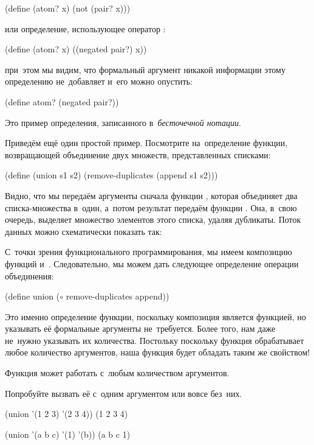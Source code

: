 \begin{SchemeCode}[emph=x]
(define (atom? x) 
  (not (pair? x)))
\end{SchemeCode}
\noindent или определение, использующее оператор :
\begin{SchemeCode}[emph=x]
(define (atom? x) 
  ((negated pair?) x))
\end{SchemeCode}
\noindent при~этом мы видим, что формальный аргумент  никакой информации этому определению не~добавляет и~его можно опустить:
\vspace{-\bigskipamount}
\begin{SchemeCode}
(define atom? (negated pair?))
\end{SchemeCode}
\noindent Это пример определения, записанного в~\emph{бесточечной нотации}.

\label{union}Приведём ещё один простой пример. Посмотрите на~определение функции, возвращающей объединение двух множеств, представленных списками:
\begin{SchemeCode}[emph={s1,s2}]
(define (union s1 s2)
  (remove-duplicates (append s1 s2)))
\end{SchemeCode}
\noindent Видно, что мы передаём аргументы сначала функции , которая объединяет два списка-множества в~один, а~потом результат передаём функции . Она, в~свою очередь, выделяет множество элементов этого списка, удаляя дубликаты. Поток данных можно схематически показать так:
\begin{center}
\end{center}

\noindent С~точки зрения функционального программирования, мы имеем композицию функций  и~. Следовательно, мы можем дать следующее определение операции объединения:

\begin{SchemeCode}
(define union ($\circ$ remove-duplicates append))
\end{SchemeCode}

Это именно определение функции, поскольку композиция является функцией, но указывать её формальные аргументы не~требуется. Более того, нам даже не~нужно указывать их количества. Постольку поскольку функция  обрабатывает любое количество аргументов, наша функция  будет обладать таким же свойством!

\begin{example}{Функция  может работать с~любым количеством аргументов.

Попробуйте вызвать её с~одним аргументом или вовсе без~них.}
\REPL
  {(union '(1 2 3) '(2 3 4))}
  {(1 2 3 4)}

\REPL
  {(union '(a b c) '(1) '(b))}
  {(a b c 1)} 
\end{example}

